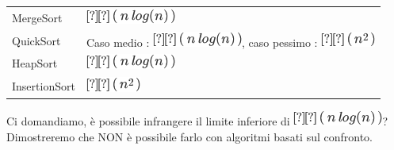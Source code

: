 \documentclass{article}
\begin{document}
{\begin{longtable}[]{@{}ll@{}}
\toprule
\begin{minipage}[t]{0.47\columnwidth}\raggedright\strut
{MergeSort}\strut
\end{minipage} & \begin{minipage}[t]{0.47\columnwidth}\raggedright\strut
\includegraphics{images/image151.png}\strut
\end{minipage}\tabularnewline
\begin{minipage}[t]{0.47\columnwidth}\raggedright\strut
{QuickSort}\strut
\end{minipage} & \begin{minipage}[t]{0.47\columnwidth}\raggedright\strut
{Caso medio : }\includegraphics{images/image151.png}{, caso pessimo :
}\includegraphics{images/image152.png}\strut
\end{minipage}\tabularnewline
\begin{minipage}[t]{0.47\columnwidth}\raggedright\strut
{HeapSort}\strut
\end{minipage} & \begin{minipage}[t]{0.47\columnwidth}\raggedright\strut
\includegraphics{images/image151.png}\strut
\end{minipage}\tabularnewline
\begin{minipage}[t]{0.47\columnwidth}\raggedright\strut
{InsertionSort}\strut
\end{minipage} & \begin{minipage}[t]{0.47\columnwidth}\raggedright\strut
\includegraphics{images/image152.png}\strut
\end{minipage}\tabularnewline
\bottomrule
\end{longtable}

{}

{}

{Ci domandiamo, }{è possibile infrangere il limite inferiore di }\includegraphics{images/image151.png}{? Dimostreremo che NON è possibile farlo con algoritmi basati sul confronto.}

}
\end{document}
